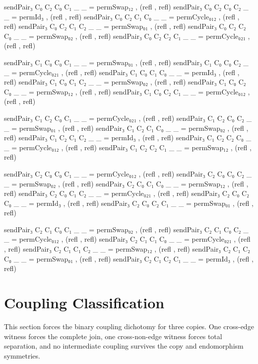 \documentclass[11pt,a4paper]{book}
\begin{document}
\begin{code}
sendPair₃ C₀ C₂ C₀ C₁ _ _ = permSwap₁₂ , (refl , refl)
sendPair₃ C₀ C₂ C₀ C₂ _ _ = permId₃ , (refl , refl)
sendPair₃ C₀ C₂ C₁ C₀ _ _ = permCycle₀₁₂ , (refl , refl)
sendPair₃ C₀ C₂ C₁ C₂ _ _ = permSwap₀₁ , (refl , refl)
sendPair₃ C₀ C₂ C₂ C₀ _ _ = permSwap₀₂ , (refl , refl)
sendPair₃ C₀ C₂ C₂ C₁ _ _ = permCycle₀₂₁ , (refl , refl)

sendPair₃ C₁ C₀ C₀ C₁ _ _ = permSwap₀₁ , (refl , refl)
sendPair₃ C₁ C₀ C₀ C₂ _ _ = permCycle₀₂₁ , (refl , refl)
sendPair₃ C₁ C₀ C₁ C₀ _ _ = permId₃ , (refl , refl)
sendPair₃ C₁ C₀ C₁ C₂ _ _ = permSwap₀₂ , (refl , refl)
sendPair₃ C₁ C₀ C₂ C₀ _ _ = permSwap₁₂ , (refl , refl)
sendPair₃ C₁ C₀ C₂ C₁ _ _ = permCycle₀₁₂ , (refl , refl)

sendPair₃ C₁ C₂ C₀ C₁ _ _ = permCycle₀₂₁ , (refl , refl)
sendPair₃ C₁ C₂ C₀ C₂ _ _ = permSwap₀₁ , (refl , refl)
sendPair₃ C₁ C₂ C₁ C₀ _ _ = permSwap₀₂ , (refl , refl)
sendPair₃ C₁ C₂ C₁ C₂ _ _ = permId₃ , (refl , refl)
sendPair₃ C₁ C₂ C₂ C₀ _ _ = permCycle₀₁₂ , (refl , refl)
sendPair₃ C₁ C₂ C₂ C₁ _ _ = permSwap₁₂ , (refl , refl)

sendPair₃ C₂ C₀ C₀ C₁ _ _ = permCycle₀₁₂ , (refl , refl)
sendPair₃ C₂ C₀ C₀ C₂ _ _ = permSwap₀₂ , (refl , refl)
sendPair₃ C₂ C₀ C₁ C₀ _ _ = permSwap₁₂ , (refl , refl)
sendPair₃ C₂ C₀ C₁ C₂ _ _ = permCycle₀₂₁ , (refl , refl)
sendPair₃ C₂ C₀ C₂ C₀ _ _ = permId₃ , (refl , refl)
sendPair₃ C₂ C₀ C₂ C₁ _ _ = permSwap₀₁ , (refl , refl)

sendPair₃ C₂ C₁ C₀ C₁ _ _ = permSwap₀₂ , (refl , refl)
sendPair₃ C₂ C₁ C₀ C₂ _ _ = permCycle₀₁₂ , (refl , refl)
sendPair₃ C₂ C₁ C₁ C₀ _ _ = permCycle₀₂₁ , (refl , refl)
sendPair₃ C₂ C₁ C₁ C₂ _ _ = permSwap₁₂ , (refl , refl)
sendPair₃ C₂ C₁ C₂ C₀ _ _ = permSwap₀₁ , (refl , refl)
sendPair₃ C₂ C₁ C₂ C₁ _ _ = permId₃ , (refl , refl)
\end{code}

\section{Coupling Classification}

This section forces the binary coupling dichotomy for three copies.
One cross-edge witness forces the complete join, one cross-non-edge witness
forces total separation, and no intermediate coupling survives the copy and
endomorphism symmetries.
\end{document}
